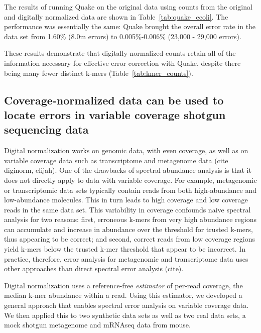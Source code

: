 \documentclass{article}
\begin{document}
The results of running Quake on the original data using counts from
the original and digitally normalized data are shown in
Table~\ref{tab:quake_ecoli}.  The performance was essentially the
same: Quake brought the overall error rate in the data set from 1.60\%
(8.0m errors) to 0.005\%-0.006\% (23,000 - 29,000 errors).

These results demonstrate that digitally normalized counts retain all
of the information necessary for effective error correction with
Quake, despite there being many fewer distinct k-mers
(Table~\ref{tab:kmer_counts}).

%

\subsection{Coverage-normalized data can be used to locate errors in variable
coverage shotgun sequencing data}

Digital normalization works on genomic data, with even coverage, as
well as on variable coverage data such as transcriptome and metagenome
data (cite diginorm, elijah).  One of the drawbacks of
spectral abundance analysis is that it does not directly apply to data
with variable coverage.  For example, metagenomic or transcriptomic data
sets typically contain reads from both high-abundance and
low-abundance molecules.  This in turn leads to high coverage and low
coverage reads in the same data set. This variability in coverage
confounds naive spectral analysis for two reasons: first, erroneous
k-mers from very high abundance regions can accumulate and increase in
abundance over the threshold for trusted k-mers, thus appearing to be
correct; and second, correct reads from low coverage regions yield
k-mers below the trusted k-mer threshold that appear to be incorrect.
In practice, therefore, error analysis for metagenomic and
transcriptome data uses other approaches than direct spectral error
analysis (cite).

Digital normalization uses a reference-free {\em estimator} of
per-read coverage, the median k-mer abundance within a read.  Using
this estimator, we developed a general approach that enables spectral
error analysis on variable coverage data.  We then applied this to two
synthetic data sets as well as two real data sets, a mock shotgun
metagenome and mRNAseq data from mouse.
\end{document}
